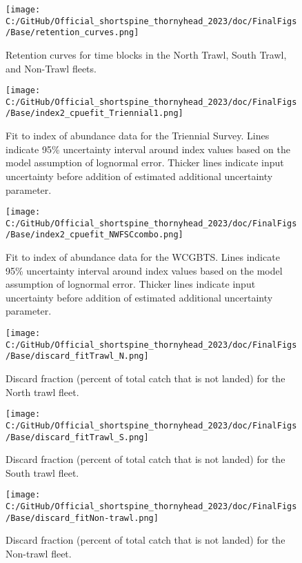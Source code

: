 \documentclass[11pt,
  letterpaper,
]{article}
\begin{document}
\begin{figure}
\centering
\texttt{[image: C:/GitHub/Official\_shortspine\_thornyhead\_2023/doc/FinalFigs/Base/retention\_curves.png]}
\caption{Retention curves for time blocks in the North Trawl, South Trawl, and Non-Trawl fleets.\label{fig:retblocks}}
\end{figure}

\begin{figure}
\centering
\texttt{[image: C:/GitHub/Official\_shortspine\_thornyhead\_2023/doc/FinalFigs/Base/index2\_cpuefit\_Triennial1.png]}
\caption{Fit to index of abundance data for the Triennial Survey. Lines indicate 95\% uncertainty interval around index values based on the model assumption of lognormal error. Thicker lines indicate input uncertainty before addition of estimated additional uncertainty parameter.\label{fig:fitsTri1}}
\end{figure}

\begin{figure}
\centering
\texttt{[image: C:/GitHub/Official\_shortspine\_thornyhead\_2023/doc/FinalFigs/Base/index2\_cpuefit\_NWFSCcombo.png]}
\caption{Fit to index of abundance data for the WCGBTS. Lines indicate 95\% uncertainty interval around index values based on the model assumption of lognormal error. Thicker lines indicate input uncertainty before addition of estimated additional uncertainty parameter.\label{fig:fitscombo}}
\end{figure}

\begin{figure}
\centering
\texttt{[image: C:/GitHub/Official\_shortspine\_thornyhead\_2023/doc/FinalFigs/Base/discard\_fitTrawl\_N.png]}
\caption{Discard fraction (percent of total catch that is not landed) for the North trawl fleet.\label{fig:northtrl_disc}}
\end{figure}

\begin{figure}
\centering
\texttt{[image: C:/GitHub/Official\_shortspine\_thornyhead\_2023/doc/FinalFigs/Base/discard\_fitTrawl\_S.png]}
\caption{Discard fraction (percent of total catch that is not landed) for the South trawl fleet.\label{fig:southtrl_disc}}
\end{figure}

\begin{figure}
\centering
\texttt{[image: C:/GitHub/Official\_shortspine\_thornyhead\_2023/doc/FinalFigs/Base/discard\_fitNon-trawl.png]}
\caption{Discard fraction (percent of total catch that is not landed) for the Non-trawl fleet.\label{fig:nontrl_disc}}
\end{figure}
\end{document}
